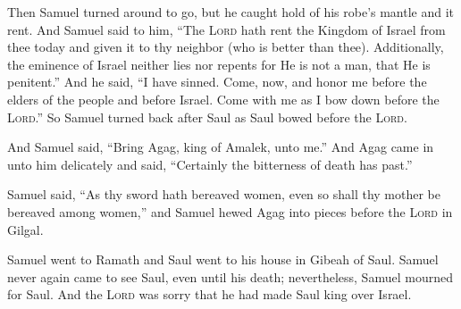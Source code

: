 \begin{inparaenum}
   Then Samuel turned around to go, but he caught hold of his robe's mantle and it rent.%
   And Samuel said to him, ``The \textsc{Lord} hath rent the Kingdom of Israel from thee today and given it to thy neighbor (who is better than thee).%
   Additionally, the eminence of Israel neither lies nor repents for He is not a man, that He is penitent.''%
   And he said, ``I have sinned. Come, now, and honor me before the elders of the people and before Israel. Come with me as I bow down before the \textsc{Lord}.''%
   So Samuel turned back after Saul as Saul bowed before the \textsc{Lord}.%
  
   And Samuel said, ``Bring Agag, king of Amalek, unto me.'' And Agag came in unto him delicately and said, ``Certainly the bitterness of death has past.''%
  
   Samuel said, ``As thy sword hath bereaved women, even so shall thy mother be bereaved among women,'' and Samuel hewed Agag into pieces before the \textsc{Lord} in Gilgal.%
  
   Samuel went to Ramath and Saul went to his house in Gibeah of Saul.%
   Samuel never again came to see Saul, even until his death; nevertheless, Samuel mourned for Saul. And the \textsc{Lord} was sorry that he had made Saul king over Israel.%
\end{inparaenum}
